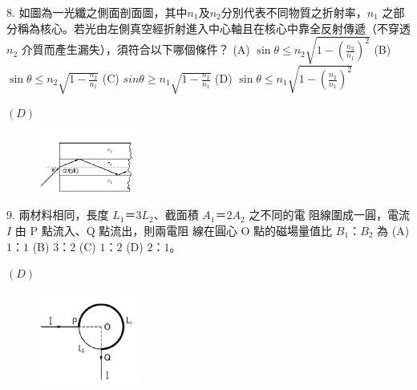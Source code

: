 \documentclass[cn,10pt,math=newtx,chinesefont=founder,device=ig]{elegantbook}
\begin{document}
\newpage

\begin{example}
   8. 如圖為一光纖之側面剖面圖，其中$n_1$及$n_2$分別代表不同物質之折射率，$n_1$ 之部分稱為核心。若光由左側真空經折射進入中心軸且在核心中靠全反射傳遞（不穿透 $n_2$ 介質而產生漏失），須符合以下哪個條件？
   (A) $\sin{\theta} \le n_2 \sqrt{1-(\frac{n_2}{n_1})^2}$  (B) $\sin{\theta} \le n_2 \sqrt{1-\frac{n_2}{n_1}}$  (C) $sin{\theta} \ge n_1 \sqrt{1-\frac{n_2}{n_1}}$  (D) $\sin{\theta} \le n_1 \sqrt{1-(\frac{n_2}{n_1})^2}$     \\
    \rightline{[全國聯招教甄109]}
\end{example}
\begin{solution}
    $(D)$
\end{solution}
\begin{figure}[htbp]
    \flushright
    \includegraphics[width=0.3\textwidth]{image/109全國8.png}
  \end{figure}
\newpage



\begin{example}
   9. 兩材料相同，長度 $L_1＝3L_2$、截面積 $A_1＝2A_2$ 之不同的電
阻線圍成一圓，電流 $I$ 由 P 點流入、Q 點流出，則兩電阻
線在圓心 O 點的磁場量值比 $B_1：B_2$ 為 (A) $1：1$ (B) $3：2$
(C) $1：2$ (D) $2：1$。\\
    \rightline{[全國聯招教甄109]}
\end{example}
\begin{solution}
    $(D)$
\end{solution}
\begin{figure}[htbp]
    \flushright
    \includegraphics[width=0.3\textwidth]{image/109全國9.png}
  \end{figure}
\newpage
\end{document}
